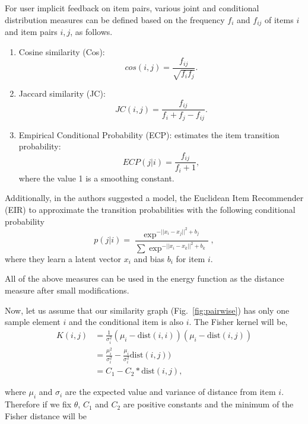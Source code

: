 For user implicit feedback on item pairs, various joint and conditional distribution measures can be defined based on the frequency $f_i$ and $f_{ij}$ of items $i$ and item pairs $i,j$, as follows.
%
\begin{enumerate}
%
\item Cosine similarity (Cos):
%
\begin{equation}
cos(i,j) = \frac{f_{ij}}{\sqrt{f_i f_j}}.
\nonumber
\end{equation}
%
\item Jaccard similarity (JC):
%
\begin{equation}
JC(i,j) = \frac{f_{ij}}{f_i+f_j-f_{ij}}.
\nonumber
\end{equation}
%
\item Empirical Conditional Probability (ECP): estimates the item transition probability:
%
\begin{equation}
ECP(j|i) = \frac{f_{ij}}{f_i+1},
\nonumber 
\end{equation}
%
where the value 1 is a smoothing constant. 
\end{enumerate}
%
Additionally, in \cite{koenigstein2013towards} the authors suggested a model, the Euclidean Item Recommender (EIR) to approximate the transition probabilities with the following conditional probability
%
\begin{equation}
p(j | i) = \frac{\exp^{-||x_i-x_j||^2 + b_j}}{\sum \exp^{-||x_i-x_k||^2+b_k}},
\nonumber
\end{equation}
%
where they learn a latent vector $x_i$ and bias $b_i$ for item $i$. 

All of the above measures can be used in the energy function as the distance measure after small modifications. 

Now, let us assume that our similarity graph (Fig.~\ref{fig:pairwise}) has only one sample element $i$ and the conditional item is also $i$. The Fisher kernel will be,
%
\begin{equation}
\nonumber
\begin{split}
K(i,j) &= \frac{1}{\sigma_{i}^2} (\mu_i - \mbox{dist}(i,i))(\mu_i-\mbox{dist}(i,j)) \\
       &= \frac{\mu_i^2}{\sigma_{i}^2} - \frac{\mu_i}{\sigma_{i}^2} \mbox{dist}(i,j)) \\
       &= C_1-C_2*\mbox{dist}(i,j),
\end{split}
\end{equation}

where $\mu_i$ and $\sigma_i$ are the expected value and variance of distance from item $i$. Therefore if we fix $\theta$, $C_1$ and $C_2$ are positive constants and the minimum of the 
Fisher distance will be %


